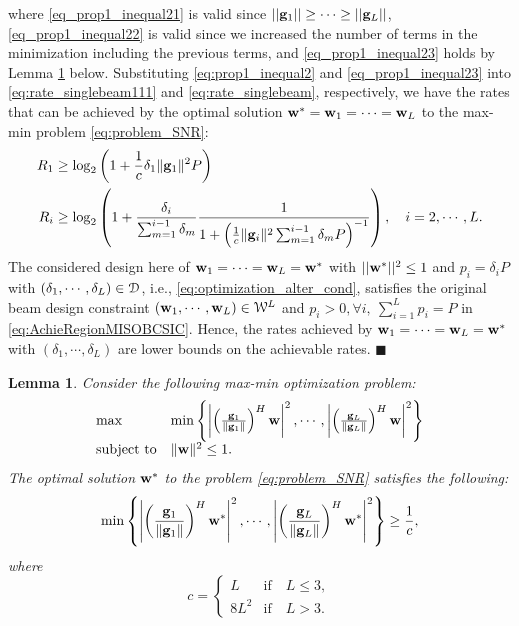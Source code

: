 \documentclass[11pt, draft, onecolumn ]{IEEEtran}
\newtheorem{lemma}{Lemma}
\begin{document}
where \eqref{eq_prop1_inequal21} is valid since $||{\bf g}_1||\ge \cdots \ge ||{\bf g}_L||$, \eqref{eq_prop1_inequal22} is valid since we increased the number of terms in the minimization including the previous terms, and \eqref{eq_prop1_inequal23} holds by Lemma \ref{Lemma:lemma1} below.
Substituting
\eqref{eq:prop1_inequal2} and   \eqref{eq_prop1_inequal23} into
\eqref{eq:rate_singlebeam111} and \eqref{eq:rate_singlebeam}, respectively, we have the rates  that can be achieved by the optimal solution  ${\bf w}^*={\bf w}_1=\cdots={\bf w}_L$ to the max-min problem \eqref{eq:problem_SNR}:
\begin{align}
    R_1 &\geq \log_2 \left( 1 + \frac{1}{c} \delta_1 \|{\bf g}_1\|^2 P \right) \\
    R_i &\geq \log_2 \left( 1 + \frac{\delta_i}{\sum_{m=1}^{i-1} \delta_m} \frac{1}{1 + \left(\frac{1}{c} \|{\bf g}_i\|^2\sum_{m=1}^{i-1} \delta_m P \right)^{-1}}\right),
    \quad i = 2, \cdots, L.
\end{align}
The considered design here of  ${\bf w}_1=\cdots={\bf w}_L={\bf w}^*$ with $||{\bf w}^*||^2 \le 1$ and $p_i = \delta_i P$ with $(\delta_1,\cdots,\delta_L) \in {\cal D}$, i.e., \eqref{eq:optimization_alter_cond}, satisfies the original beam design constraint $({\bf w}_1, \cdots, {\bf w}_L) \in \mathcal{W}^L$  and $p_i >0, \forall i,~\sum_{i=1}^L p_i = P$ in  \eqref{eq:AchieRegionMISOBCSIC}.   Hence, the rates achieved by  ${\bf w}_1=\cdots={\bf w}_L={\bf w}^*$ with $(\delta_1,\cdots,\delta_L)$ are lower bounds on the achievable rates. \hfill{$\blacksquare$}



\begin{lemma}  \label{Lemma:lemma1}
Consider the following max-min optimization problem:
\begin{equation} \label{eq:problem_SNR}
    \begin{array}{ll}
      \max & \min{\left\{ \left| \left(\frac{{\bf g}_1}{\|{\bf g}_1\|}\right)^H {\bf w}\right|^2, \cdots, \left| \left(\frac{{\bf g}_L}{\|{\bf g}_L\|}\right)^H {\bf w}\right|^2\right\}} \\
      \mathrm{subject ~ to} & \|{\bf w}\|^2 \leq 1.
    \end{array}
\end{equation}
The optimal solution ${\bf w}^*$ to
the problem \eqref{eq:problem_SNR} satisfies the following:
\begin{equation}
        \min{\left\{ \left| \left(\frac{{\bf g}_1}{\|{\bf g}_1\|}\right)^H {\bf w}^*\right|^2, \cdots, \left| \left(\frac{{\bf g}_L}{\|{\bf g}_L\|}\right)^H {\bf w}^*\right|^2\right\}} \geq \frac{1}{c},
\end{equation}
where
\begin{equation}  \label{eq:Lemma:lemma1}
    c = \left\{ \begin{array}{ll}
                  L & \mbox{if} \quad L \leq 3, \\
                  8L^2 & \mbox{if} \quad L > 3.
                \end{array}
    \right.
\end{equation}
\end{lemma}
\end{document}
